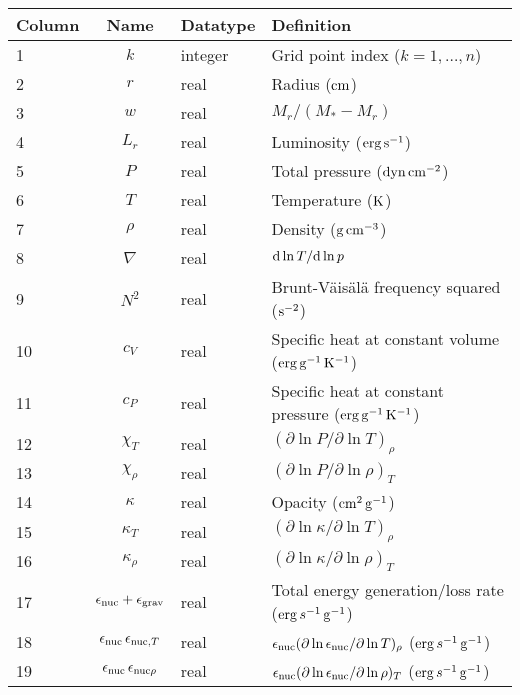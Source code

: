 \documentclass{article}
\newcommand{\diff}{\ensuremath{{\rm d}}}
\newcommand{\Mstar}{\ensuremath{M_{\ast}}}
\newcommand{\cm}{\ensuremath{{\rm cm}}}
\newcommand{\gram}{\ensuremath{{\rm g}}}
\newcommand{\second}{\ensuremath{{\rm s}}}
\newcommand{\dyne}{\ensuremath{{\rm dyn}}}
\newcommand{\erg}{\ensuremath{{\rm erg}}}
\newcommand{\kelvin}{\ensuremath{{\rm K}}}
\begin{document}
\begin{table}[h!]
\begin{tabular}{|l|c|l|l|} \hline
Column & Name & Datatype & Definition \\ \hline
1      & $k$ & integer & Grid point index ($k=1,\ldots,n$) \\
2      & $r$ & real    & Radius ($\cm$) \\
3      & $w$ & real    & $M_{r}/(\Mstar-M_{r})$ \\
4      & $L_{r}$ & real & Luminosity ($\erg\,\second^{-1}$) \\
5      & $P$ & real    & Total pressure ($\dyne\,\cm^{-2}$) \\
6      & $T$ & real    & Temperature ($\kelvin$) \\
7      & $\rho$ & real & Density ($\gram\,\cm^{-3}$) \\
8      & $\nabla$ & real & $\diff \ln T/\diff \ln p$ \\
9      & $N^{2}$ & real & Brunt-V\"ais\"al\"a frequency squared ($\second^{-2}$) \\
10      & $c_{V}$ & real & Specific heat at constant volume ($\erg\,\gram^{-1}\,\kelvin^{-1}$) \\
11     & $c_{P}$ & real & Specific heat at constant pressure ($\erg\,\gram^{-1}\,\kelvin^{-1}$) \\
12     & $\chi_{T}$ & real & $(\partial \ln P/\partial \ln T)_{\rho} $ \\
13     & $\chi_{\rho}$ & real & $(\partial \ln P/\partial \ln \rho)_{T} $ \\
14     & $\kappa$ & real & Opacity ($\cm^{2}\,\gram^{-1}$) \\
15     & $\kappa_{T}$ & real & $(\partial \ln \kappa/\partial \ln T)_{\rho}$ \\
16     & $\kappa_{\rho}$ & real & $(\partial \ln \kappa/\partial \ln \rho)_{T}$ \\
17     & $\epsilon_{\rm nuc} + \epsilon_{\rm grav}$ & real & Total energy generation/loss rate ($\erg\,s^{-1}\,\gram^{-1}$) \\
18     & $\epsilon_{\rm nuc}\,\epsilon_{{\rm nuc},T}$ & real & $\epsilon_{\rm nuc} (\partial \ln \epsilon_{\rm nuc}/\partial \ln T)_{\rho}$ ($\erg\,s^{-1}\,\gram^{-1}$) \\
19     & $\epsilon_{\rm nuc}\,\epsilon_{{\rm nuc}\rho}$ & real & $\epsilon_{\rm nuc} (\partial \ln \epsilon_{\rm nuc}/\partial \ln \rho)_{T}$ ($\erg\,s^{-1}\,\gram^{-1}$) \\ \hline
\end{tabular}
\end{table}
\end{document}
